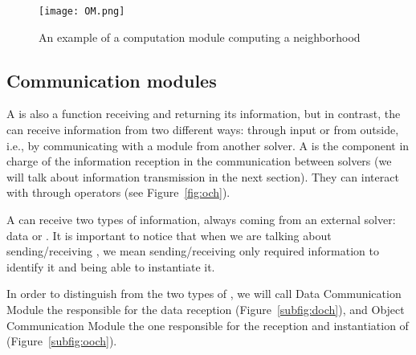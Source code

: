 \vspace{0.5cm}
\begin{figure}
	\centering	
	\texttt{[image: OM.png]}
	\caption{An example of a computation module computing a neighborhood}\label{fig:om}
\end{figure}

\subsection{Communication modules}


A \opch{} is also a function receiving and returning its information, but in contrast, the \opch{} can receive information from two different ways: through input or from outside, i.e., by communicating with a module from another solver. A \opch{} is the component in charge of the information reception in the communication between solvers (we will talk about information transmission in the next section). They can interact with \oms{} through operators (see Figure~\ref{fig:och}).

A \opch{} can receive two types of information, always coming from an external solver: data or \oms{}. It is important to notice that when we are talking about sending/receiving \oms, we mean sending/receiving only required information to identify it and being able to instantiate it.

In order to distinguish from the two types of \opchs, we will call Data Communication Module the \opch{} responsible for the data reception (Figure~\ref{subfig:doch}), and Object Communication Module the one responsible for the reception and instantiation of \oms{} (Figure~\ref{subfig:ooch}).


%

